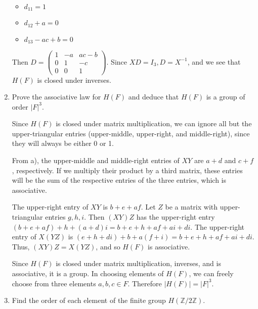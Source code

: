 \documentclass{article}
\begin{document}
\begin{enumerate}[label=(\alph*)]
          \begin{itemize}
            \item $d_{11} = 1$
            \item $d_{12} + a = 0$
            \item $d_{13} - ac + b = 0$
          \end{itemize}

          Then $D = \begin{pmatrix}1 & -a & ac - b \\ 0 & 1 & -c \\ 0 & 0 & 1\end{pmatrix}$. Since $XD = I_3, D = X^{-1}$, and we see that $H(F)$ is closed under inverses.
    
    \item Prove the associative law for $H(F)$ and deduce that $H(F)$ is a group of order $|F|^3$.

          Since $H(F)$ is closed under matrix multiplication, we can ignore all but the upper-triangular entries (upper-middle, upper-right, and middle-right), since they will always be either 0 or 1.
          
          From a), the upper-middle and middle-right entries of $XY$ are $a + d$ and $c + f$, respectively. If we multiply their product by a third matrix, these entries will be the sum of the respective entries of the three entries, which is associative.

          The upper-right entry of $XY$ is $b + e + af$. Let $Z$ be a matrix with upper-triangular entries $g, h, i$. Then $(XY)Z$ has the upper-right entry $(b + e + af) + h + (a + d)i = b + e + h + af + ai + di$. The upper-right entry of $X(YZ)$ is $(e + h + di) + b + a(f + i) = b + e + h + af + ai + di$. Thus, $(XY)Z = X(YZ)$, and so $H(F)$ is associative.

          Since $H(F)$ is closed under matrix multiplication, inverses, and is associative, it is a group. In choosing elements of $H(F)$, we can freely choose from three elements $a, b, c \in F$. Therefore $|H(F)| = |F|^3$.

    \item Find the order of each element of the finite group $H(\mathbb{Z}/2\mathbb{Z})$.


\end{enumerate}
\end{document}
